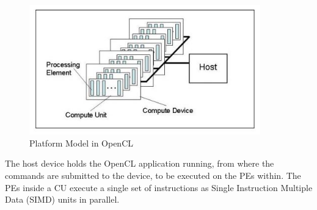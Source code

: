 \begin{figure}[h!]
  \centering
  \includegraphics[width=10cm]{figures/OpenCL_Platform_Model.JPG}
  \caption{Platform Model in OpenCL}
  \label{fig:opencl1}
\end{figure}
The host device holds the OpenCL application running, from where the commands are submitted to the device, to be executed on the PEs within. The PEs inside a CU execute a single set of instructions as Single Instruction Multiple Data (SIMD) units in parallel. 

